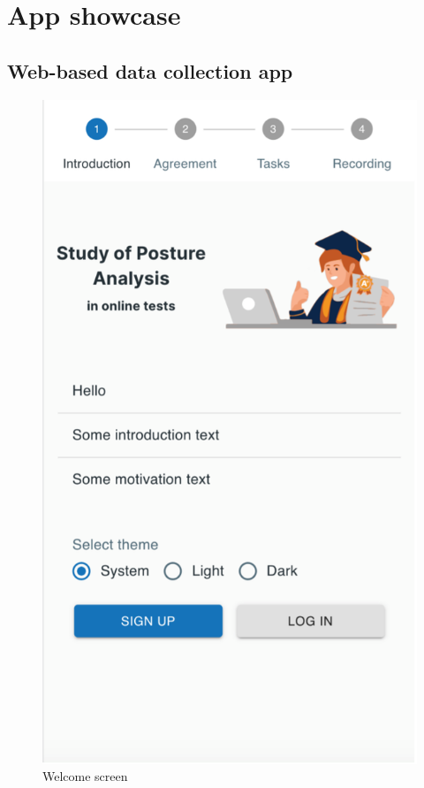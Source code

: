 \chapter{App showcase}
\section{Web-based data collection app}
\begin{minipage}{.5\textwidth}
\begin{figure}[H]
    \centering
    \includegraphics[width=\textwidth]{appendix/imgs/web-welcome.png}
    \caption{Welcome screen}
    \label{fig:web-welcome}
\end{figure}
\end{minipage}
